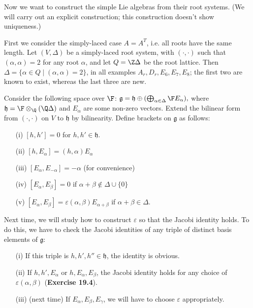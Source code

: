 \documentclass[11pt]{article}
\newcommand{\g}{\mathfrak{g}}
\newcommand{\h}{\mathfrak{h}}
\begin{document}
Now we want to construct the simple Lie algebras from their
root systems.  (We will carry out an explicit construction; this construction
doesn't show uniqueness.)

First we consider the simply-laced case $A = A^T$, i.e. all 
roots have the same length.  Let $(V, \Delta)$ be a simply-laced
root system, with $(\cdot, \cdot)$ such that $(\alpha, \alpha) = 2$
for any root $\alpha$, and let $Q = \Z \Delta$ be the root lattice.
Then $\Delta = \{ \alpha \in Q \mid (\alpha, \alpha) = 2 \}$, in
all examples $A_r, D_r, E_6, E_7, E_8$; the first two are known to
exist, whereas the last three are new.  

Consider the following space over $\F$: $\g = \h \oplus (\bigoplus_{\alpha
\in \Delta} \F E_\alpha),$ where $\h = \F \otimes_\Q (\Q \Delta)$
and $E_\alpha$ are some non-zero vectors.  Extend the bilinear
form from $(\cdot, \cdot)$ on $V$ to $\h$ by bilinearity. Define brackets on
$\g$ as follows:
\begin{enumerate}
\item[(i)] $[h, h'] = 0$ for $h, h' \in \h$.
\item[(ii)] $[h, E_\alpha] = (h, \alpha) E_\alpha$
\item[(iii)] $[E_\alpha, E_{-\alpha}] = -\alpha$ (for convenience)
\item[(iv)] $[E_\alpha, E_\beta] = 0$ if $\alpha + \beta \not\in \Delta \cup \{ 0 \}$
\item[(v)] $[E_\alpha, E_\beta] = \varepsilon(\alpha, \beta)
  E_{\alpha+\beta}$ if $\alpha+\beta \in \Delta$.
\end{enumerate}

Next time, we will study how to construct $\varepsilon$ so that the
Jacobi identity holds.  To do this, we have to check the Jacobi identities
of any triple of distinct basis elements of $\g$:
\begin{enumerate}
\item[(i)] If this triple is $h, h', h'' \in \h$, the identity is obvious.
\item[(ii)] If $h, h', E_\alpha$ or $h, E_\alpha, E_\beta$,
the Jacobi identity holds for any choice of $\varepsilon(\alpha, \beta)$
({\bf Exercise 19.4}).
\item[(iii)] (next time) If $E_\alpha, E_\beta, E_\gamma$, we will have to choose
$\varepsilon$ appropriately.
\end{enumerate}
\end{document}
